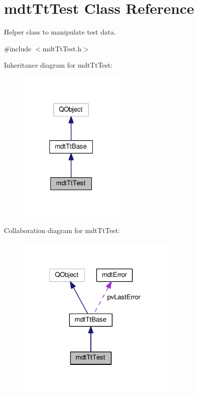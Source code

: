 \hypertarget{classmdt_tt_test}{\section{mdt\-Tt\-Test Class Reference}
\label{classmdt_tt_test}
}


Helper class to manipulate test data.  




{\ttfamily \#include $<$mdt\-Tt\-Test.\-h$>$}



Inheritance diagram for mdt\-Tt\-Test\-:
\nopagebreak
\begin{figure}[H]
\begin{center}
\leavevmode
\includegraphics[width=144pt]{classmdt_tt_test__inherit__graph}
\end{center}
\end{figure}


Collaboration diagram for mdt\-Tt\-Test\-:
\nopagebreak
\begin{figure}[H]
\begin{center}
\leavevmode
\includegraphics[width=218pt]{classmdt_tt_test__coll__graph}
\end{center}
\end{figure}
